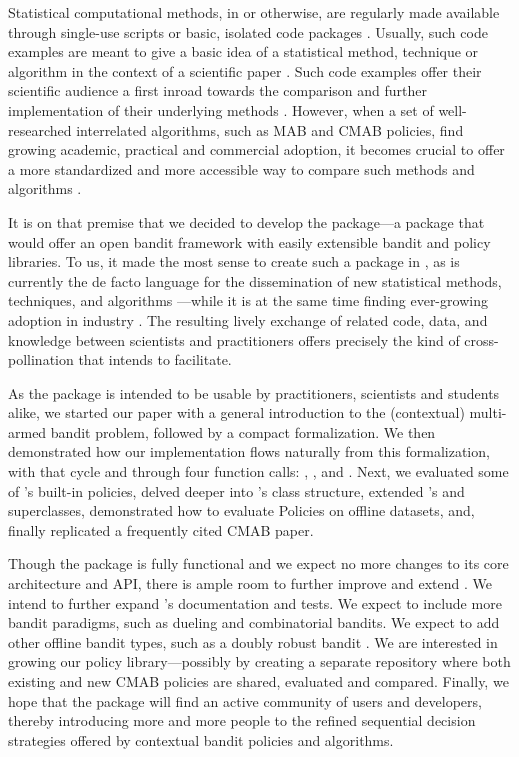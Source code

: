 \documentclass{jss}
\begin{document}
Statistical computational methods, in  or otherwise, are regularly made available through single-use scripts or basic, isolated code packages \citep{Gandrud2016}. Usually, such code examples are meant to give a basic idea of a statistical method, technique or algorithm in the context of a scientific paper \citep{Stodden2013}. Such code examples offer their scientific audience a first inroad towards the comparison and further implementation of their underlying methods \citep{Buckheit1995}. However, when a set of well-researched interrelated algorithms, such as MAB and CMAB policies, find growing academic, practical and commercial adoption, it becomes crucial to offer a more standardized and more accessible way to compare such methods and algorithms \citep{Mesirov2010}.

It is on that premise that we decided to develop the   package---a package that would offer an open bandit framework with easily extensible bandit and policy libraries. To us, it made the most sense to create such a package in  \citep{RCore}, as  is currently the de facto language for the dissemination of new statistical methods, techniques, and algorithms \citep{Tippmann2015}---while it is at the same time finding ever-growing adoption in industry \citep{2012}. The resulting lively exchange of  related code, data, and knowledge between scientists and practitioners offers precisely the kind of cross-pollination that  intends to facilitate.

As the package is intended to be usable by practitioners, scientists and students alike, we started our paper with a general introduction to the (contextual) multi-armed bandit problem, followed by a compact formalization. We then demonstrated how our implementation flows naturally from this formalization, with  that cycle  and  through four function calls: , ,  and . Next, we evaluated some of 's built-in policies, delved deeper into 's class structure, extended 's  and  superclasses, demonstrated how to evaluate Policies on offline datasets, and, finally replicated a frequently cited CMAB paper.

Though the package is fully functional and we expect no more changes to its core architecture and API, there is ample room to further improve and extend . We intend to further expand 's documentation and tests. We expect to include more bandit paradigms, such as dueling and combinatorial bandits. We expect to add other offline bandit types, such as a doubly robust bandit \citep{Dudik2011}. We are interested in growing our policy library---possibly by creating a separate repository where both existing and new CMAB policies are shared, evaluated and compared. Finally, we hope that the package will find an active community of users and developers, thereby introducing more and more people to the refined sequential decision strategies offered by contextual bandit policies and algorithms.
\end{document}
